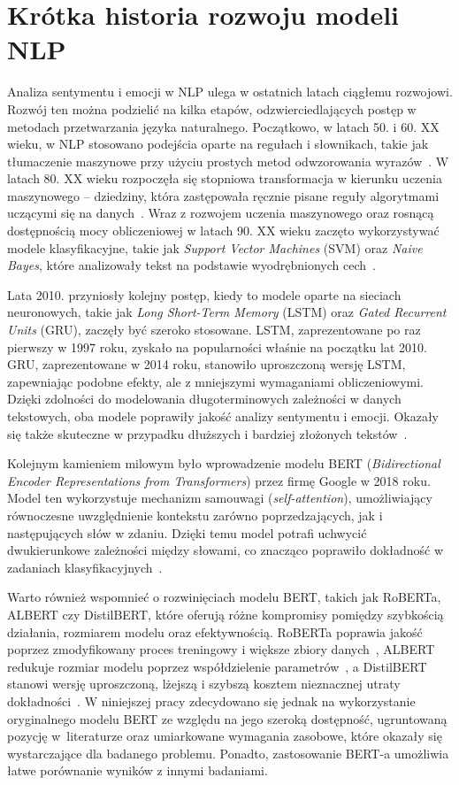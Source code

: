 \section{Krótka historia rozwoju modeli NLP}
Analiza sentymentu i emocji w NLP ulega w ostatnich latach ciągłemu rozwojowi. Rozwój ten można podzielić na kilka etapów, odzwierciedlających postęp w metodach przetwarzania języka naturalnego. Początkowo, w latach 50. i 60. XX wieku, w NLP stosowano podejścia oparte na regułach i słownikach, takie jak tłumaczenie maszynowe przy użyciu prostych metod odwzorowania wyrazów~\cite{NLPHistory1}. W latach 80. XX wieku rozpoczęła się stopniowa transformacja w kierunku uczenia maszynowego -- dziedziny, która zastępowała ręcznie pisane reguły algorytmami uczącymi się na danych~\cite{NLPHistory2}. Wraz z rozwojem uczenia maszynowego oraz rosnącą dostępnością mocy obliczeniowej w latach 90. XX wieku zaczęto wykorzystywać modele klasyfikacyjne, takie jak \textit{Support Vector Machines} (SVM) oraz \textit{Naive Bayes}, które analizowały tekst na podstawie wyodrębnionych cech~\cite{NLP2017}.

Lata 2010. przyniosły kolejny postęp, kiedy to modele oparte na sieciach neuronowych, takie jak \textit{Long Short-Term Memory} (LSTM) oraz \textit{Gated Recurrent Units} (GRU), zaczęły być szeroko stosowane. LSTM, zaprezentowane po raz pierwszy w 1997 roku, zyskało na popularności właśnie na początku lat 2010. GRU, zaprezentowane w 2014 roku, stanowiło uproszczoną wersję LSTM, zapewniając podobne efekty, ale z mniejszymi wymaganiami obliczeniowymi. Dzięki zdolności do modelowania długoterminowych zależności w danych tekstowych, oba modele poprawiły jakość analizy sentymentu i emocji. Okazały się także skuteczne w przypadku dłuższych i bardziej złożonych tekstów~\cite{SentA2020}.

Kolejnym kamieniem milowym było wprowadzenie modelu BERT (\textit{Bidirectional Encoder Representations from Transformers}) przez firmę Google w 2018 roku. Model ten wykorzystuje mechanizm samouwagi (\textit{self-attention}), umożliwiający równoczesne uwzględnienie kontekstu zarówno poprzedzających, jak i następujących słów w zdaniu. Dzięki temu model potrafi uchwycić dwukierunkowe zależności między słowami, co znacząco poprawiło dokładność w zadaniach klasyfikacyjnych~\cite{BERT}.

Warto również wspomnieć o rozwinięciach modelu BERT, takich jak RoBERTa, ALBERT czy DistilBERT, które oferują różne kompromisy pomiędzy szybkością działania, rozmiarem modelu oraz efektywnością. RoBERTa poprawia jakość poprzez zmodyfikowany proces treningowy i większe zbiory danych~\cite{RoBERTa}, ALBERT redukuje rozmiar modelu poprzez współdzielenie parametrów~\cite{ALBERT}, a DistilBERT stanowi wersję uproszczoną, lżejszą i szybszą kosztem nieznacznej utraty dokładności~\cite{DistilBERT}. W niniejszej pracy zdecydowano się jednak na wykorzystanie oryginalnego modelu BERT ze względu na jego szeroką dostępność, ugruntowaną pozycję w~literaturze oraz umiarkowane wymagania zasobowe, które okazały się wystarczające dla badanego problemu. Ponadto, zastosowanie BERT-a umożliwia łatwe porównanie wyników z innymi badaniami.

